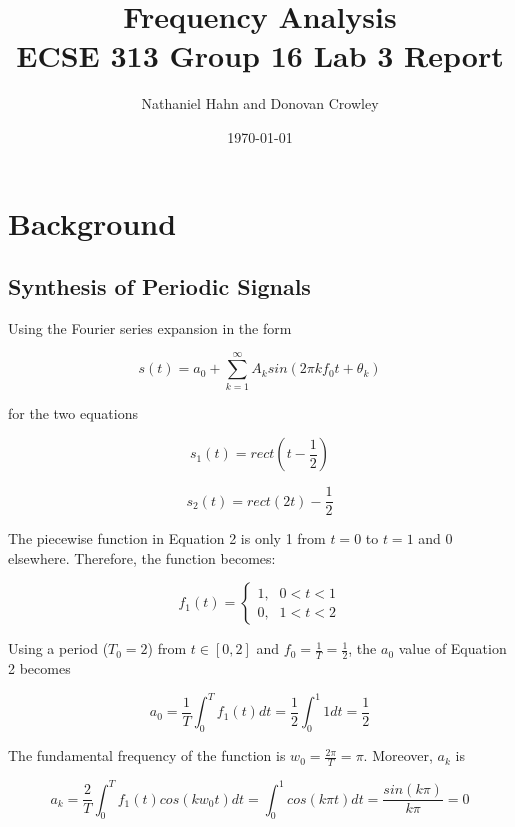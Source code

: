 \documentclass[11pt,a4paper]{article}
\title{Frequency Analysis \\ [1ex] \large ECSE 313 Group 16 Lab 3 Report}
\author{Nathaniel Hahn and Donovan Crowley}
\date{\today}
\begin{document}
\maketitle 

\tableofcontents 
\newpage

\section{Background}

\subsection{Synthesis of Periodic Signals}
Using the Fourier series expansion in the form

\begin{equation}
    s(t) = a_0 + \sum_{k=1}^{\infty} A_k sin(2\pi kf_0t + \theta_{k})
\end{equation}

for the two equations

\begin{equation}
    s_1(t) = rect(t - \frac{1}{2})
\end{equation}

\begin{equation}
    s_2(t) = rect(2t) - \frac{1}{2}
\end{equation}

The piecewise function in Equation 2 is only 1 from $t=0$ to $t=1$ and 0 elsewhere. Therefore, the function becomes:

\begin{equation}
    f_1(t) = \begin{cases}
                1\text{,} &  0 < t < 1 \\
                0\text{,} & 1 < t < 2
            \end{cases}
\end{equation}

Using a period ($T_0 = 2$) from $t \in [0, 2]$ and $f_0 = \frac{1}{T} = \frac{1}{2}$, the $a_0$ value of Equation 2 becomes

\begin{equation}
    a_0 = \frac{1}{T} \int_{0}^{T} f_1(t)dt = \frac{1}{2} \int_{0}^{1} 1dt = \frac{1}{2}
\end{equation}

The fundamental frequency of the function is $w_0 = \frac{2\pi}{T} = \pi$. Moreover, $a_k$ is

\begin{equation}
    a_k = \frac{2}{T} \int_{0}^{T} f_1(t)cos(kw_0t)dt = \int_{0}^{1} cos(k\pi t)dt = \frac{sin(k \pi)}{k\pi} = 0
\end{equation}
\end{document}
